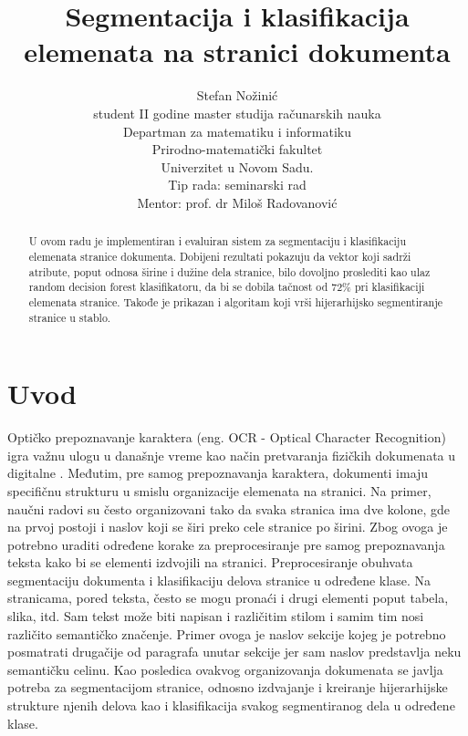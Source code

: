 \documentclass[]{amsart}
\begin{document}
\title{Segmentacija i klasifikacija elemenata na stranici dokumenta}
\author{Stefan Nožinić \\
student II godine master studija računarskih nauka \\
Departman za matematiku i informatiku \\
Prirodno-matematički fakultet \\
Univerzitet u Novom Sadu. \\
Tip rada: seminarski rad \\
Mentor: \MakeLowercase{prof. dr} Miloš Radovanović
}

\begin{abstract}
    U ovom radu je implementiran i evaluiran sistem za segmentaciju i klasifikaciju elemenata stranice dokumenta. 
	Dobijeni rezultati pokazuju da vektor koji sadrži atribute, poput odnosa širine i 
	dužine dela stranice, bilo dovoljno proslediti kao ulaz random decision
    forest klasifikatoru, da bi se dobila tačnost od 72\% pri klasifikaciji elemenata stranice. 
	Takođe je prikazan i algoritam koji vrši hijerarhijsko segmentiranje stranice u stablo.     
\end{abstract}


\maketitle
\newpage


\section{Uvod}
\label{sec:org8295245}

Optičko prepoznavanje karaktera (eng. OCR - Optical Character Recognition) igra važnu ulogu u današnje vreme kao način pretvaranja fizičkih dokumenata u digitalne \cite{mori1999optical}.
Međutim, pre samog prepoznavanja karaktera, dokumenti imaju specifičnu strukturu u smislu organizacije elemenata na stranici. Na primer, naučni radovi su često
organizovani tako da svaka stranica ima dve kolone, gde na prvoj postoji i naslov koji se širi preko cele stranice po širini. Zbog ovoga je potrebno uraditi određene korake za preprocesiranje
pre samog prepoznavanja teksta kako bi se elementi izdvojili na stranici. Preprocesiranje obuhvata segmentaciju dokumenta i klasifikaciju delova stranice u određene klase. 
Na stranicama, pored teksta, često se mogu pronaći i drugi elementi poput tabela, slika, itd.
Sam tekst može biti napisan i različitim stilom i samim tim nosi različito semantičko značenje. Primer ovoga je naslov sekcije kojeg je potrebno posmatrati
drugačije od paragrafa unutar sekcije jer sam naslov predstavlja neku semantičku celinu. 
Kao posledica ovakvog organizovanja dokumenata se javlja potreba za segmentacijom stranice, odnosno izdvajanje i kreiranje hijerarhijske strukture njenih delova kao i
klasifikacija svakog segmentiranog dela u određene klase.
\end{document}

